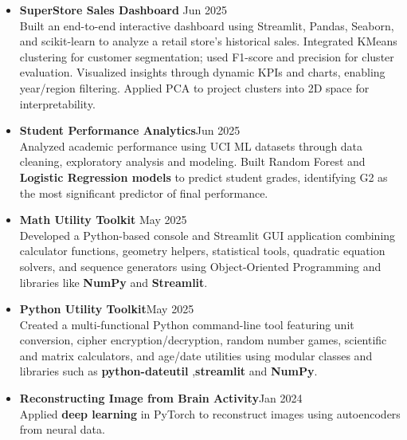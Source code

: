 \documentclass[10 pt, letterpaper]{article}
\begin{document}
\begin{itemize}
 \item \textbf{SuperStore Sales Dashboard }\textbar Jun 2025 \\Built an end-to-end interactive dashboard using Streamlit, Pandas, Seaborn, and scikit-learn to analyze a retail store’s historical sales. Integrated KMeans clustering for customer segmentation; used F1-score and precision for cluster evaluation. Visualized insights through dynamic KPIs and charts, enabling year/region filtering. Applied PCA to project clusters into 2D space for interpretability.

    \vspace{-0.15cm}
     \item \textbf{Student Performance Analytics}\textbar Jun 2025 \\Analyzed academic performance using UCI ML datasets through data cleaning, exploratory analysis and modeling. Built Random Forest and \textbf{Logistic Regression models} to predict student grades, identifying G2 as the most significant predictor of final performance.

    \vspace{-0.15cm}
    \item\textbf{Math Utility Toolkit }\textbar May 2025\\ Developed a Python-based console and Streamlit GUI application combining calculator functions, geometry helpers, statistical tools, quadratic equation solvers, and sequence generators using Object-Oriented Programming and libraries like \textbf{NumPy} and \textbf{Streamlit}.
   \vspace{-0.15cm}
    \item\textbf{Python Utility Toolkit}\textbar May 2025\\ Created a multi-functional Python command-line tool featuring unit conversion, cipher encryption/decryption, random number games, scientific and matrix calculators, and age/date utilities using modular classes and libraries such as \textbf{python-dateutil} ,\textbf{streamlit} and  \textbf{NumPy}.    
   \vspace{-0.15cm}
    \item \textbf{Reconstructing Image from Brain Activity}\textbar Jan 2024\\Applied \textbf{deep learning} in PyTorch to reconstruct images using autoencoders from neural data.


\end{itemize}
\end{document}
